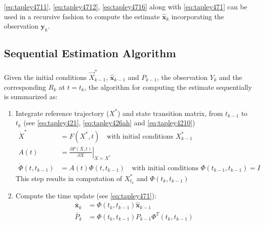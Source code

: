 \ref{eq:tapley4711}, \ref{eq:tapley4712}, \ref{eq:tapley4716} along with \ref{eq:tapley471} 
can be used in a recursive fashion to compute the estimate \(\hat{\bm{x}}_k\)
incorporating the observation \(\bm{y}_k\).

\subsection{Sequential Estimation Algorithm}
\label{ssec:sequential-estimation-algorithm}
Given the initial conditions \(\vec{X}^*_{k-1}\), \(\hat{\bm{x}}_{k-1}\) and \(P_{k-1}\),
the observation \(Y_k\) and the corresponding \(R_k\) at \(t=t_k\), the algorithm
for computing the estimate sequentially is summarized as:
\begin{enumerate}
	\item \label{en:kalman-wf-item1} Integrate reference trajectory (\(X^*\)) and
	      state transition matrix, from \(t_{k-1}\) to \(t_k\) (see \ref{eq:tapley421}, \ref{eq:tapley426ah} and \ref{eq:tapley4210})
	      \begin{subequations}
		      \begin{align}
			      \dot{X}^*               & = F( X^* , t )
			      \quad \text{with initial conditions } X^*_{k-1} \label{eq:tapley4717a} \\
			      A(t)                    & =
			      \left.\frac{\partial F(X,t)}{\partial X}\right|_{X=X^*}                \\
			      \dot{\Phi} (t, t_{k-1}) & =
			      A(t) \Phi (t,t_{k-1})
			      \quad \text{with initial conditions } \Phi(t_{k-1}, t_{k-1}) = I\label{eq:tapley4717b}
		      \end{align}
	      \end{subequations}
	      This step results in computation of \(X^*_{t_k}\) and \(\Phi (t_k, t_{k-1})\)

	\item \label{en:kalman-wf-time-update} Compute the time update (see \ref{eq:tapley471}):
	      \begin{subequations}
		      \begin{align}
			      \bar{\bm{x}}_k & = \Phi (t_k , t_{k-1}) \hat{\bm{x}}_{k-1}              \\
			      \bar{P}_k      & = \Phi (t_k , t_{k-1}) P_{k-1} \Phi ^T (t_k , t_{k-1})
		      \end{align}
	      \end{subequations}


\end{enumerate}
